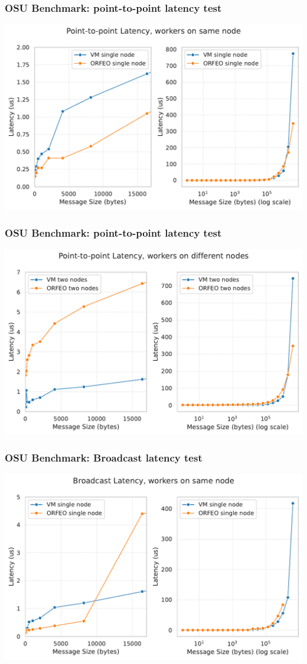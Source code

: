 \documentclass[xcolor=table,fontsize=10pt]{beamer}
\begin{document}
\begin{frame}
	\frametitle{OSU Benchmark: point-to-point latency test}
	\includegraphics[width=\textwidth]{p2p-one-node.pdf}
\end{frame}
\begin{frame}
	\frametitle{OSU Benchmark: point-to-point latency test}
	\includegraphics[width=\textwidth]{p2p-two-nodes.pdf}
\end{frame}
\begin{frame}
	\frametitle{OSU Benchmark: Broadcast latency test}
	\includegraphics[width=\textwidth]{broadcast-one-node.pdf}
\end{frame}
\end{document}

